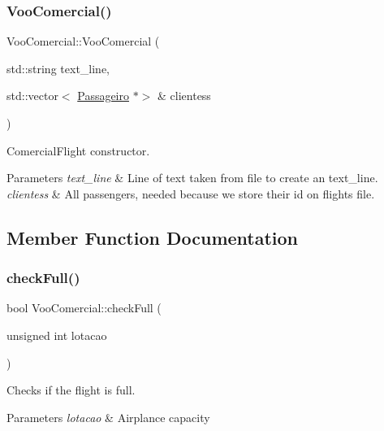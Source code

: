 \subsubsection{\texorpdfstring{Voo\+Comercial()}{VooComercial()}\hspace{0.1cm}{\footnotesize\ttfamily [2/2]}}
{\footnotesize\ttfamily Voo\+Comercial\+::\+Voo\+Comercial (\begin{DoxyParamCaption}\item[{std\+::string}]{text\+\_\+line,  }\item[{std\+::vector$<$ \hyperlink{class_passageiro}{Passageiro} $\ast$$>$ \&}]{clientess }\end{DoxyParamCaption})}



Comercial\+Flight constructor. 


\begin{DoxyParams}{Parameters}
{\em text\+\_\+line} & Line of text taken from file to create an text\+\_\+line. \\
\hline
{\em clientess} & All passengers, needed because we store their id on flights file. \\
\hline
\end{DoxyParams}


\subsection{Member Function Documentation}
\mbox{\label{class_voo_comercial_a4658609ace8bb62da8ec845252d84c59}} 
\subsubsection{\texorpdfstring{check\+Full()}{checkFull()}}
{\footnotesize\ttfamily bool Voo\+Comercial\+::check\+Full (\begin{DoxyParamCaption}\item[{unsigned int}]{lotacao }\end{DoxyParamCaption})\hspace{0.3cm}{\ttfamily [virtual]}}



Checks if the flight is full. 


\begin{DoxyParams}{Parameters}
{\em lotacao} & Airplance capacity \\
\hline
\end{DoxyParams}


